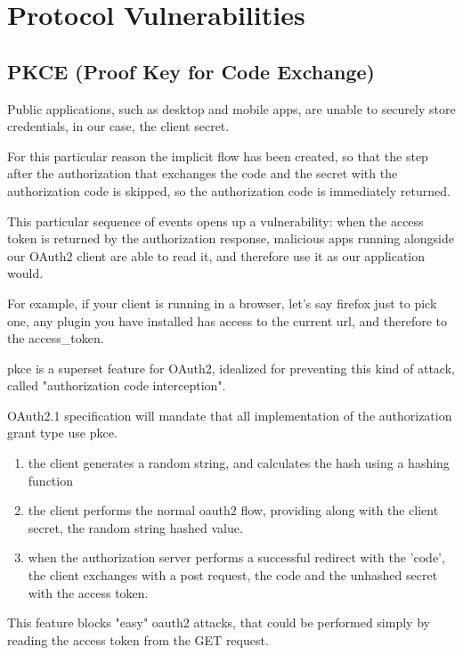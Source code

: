 
\section{Protocol Vulnerabilities}
\subsection{PKCE (Proof Key for Code Exchange)}
\label{pkce}
Public applications, such as desktop and mobile apps, are unable to securely
store credentials, in our case, the client secret.

For this particular reason the implicit flow has been created, so
that the step after the authorization that exchanges the code and the secret
with the authorization code is skipped, so the authorization code is immediately
returned.

This particular sequence of events opens up a vulnerability:
when the access token is returned by the authorization response, malicious apps
running alongside our OAuth2 client are able to read it, and therefore use it as
our application would.

For example, if your client is running in a browser, let's say firefox just to
pick one, any plugin you have installed has access to the current url, and
therefore to the access\_token.

\ac{pkce} is a superset feature for OAuth2, idealized for preventing this kind of
attack, called "authorization code interception".

OAuth2.1 specification will mandate that all implementation of the authorization
grant type use \ac{pkce}.

\begin{enumerate}
    \item the client generates a random string, and calculates the hash using a
        hashing function
    \item the client performs the normal oauth2 flow, providing along with the
        client secret, the random string hashed value.
    \item when the authorization server performs a successful redirect with the
        'code', the client exchanges with a post request, the code and the
        unhashed secret with the access token.
\end{enumerate}

This feature blocks "easy" oauth2 attacks, that could be performed simply by
reading the access token from the GET request.

